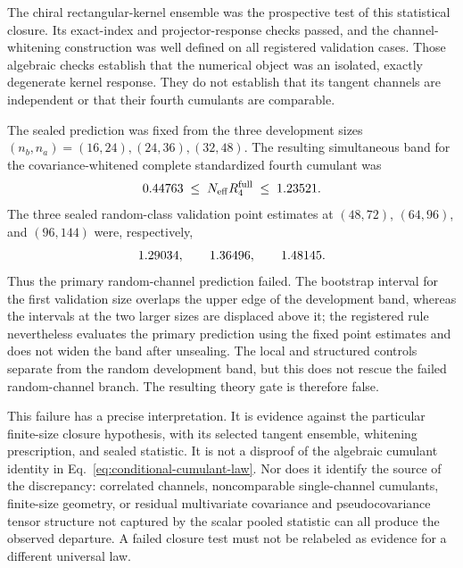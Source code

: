 The chiral rectangular-kernel ensemble was the prospective test of this
statistical closure.  Its exact-index and projector-response checks passed,
and the channel-whitening construction was well defined on all registered
validation cases.  Those algebraic checks establish that the numerical object
was an isolated, exactly degenerate kernel response.  They do not establish
that its tangent channels are independent or that their fourth cumulants are
comparable.

The sealed prediction was fixed from the three development sizes
$(n_b,n_a)=(16,24),(24,36),(32,48)$.  The resulting simultaneous band for the
covariance-whitened complete standardized fourth cumulant was
\begin{equation}
 0.44763\;\leq\;N_{\mathrm{eff}}R_4^{\mathrm{full}}
 \;\leq\;1.23521.
 \label{eq:chiral-frozen-band}
\end{equation}
The three sealed random-class validation point estimates at
$(48,72)$, $(64,96)$, and $(96,144)$ were, respectively,
\begin{equation}
 1.29034,\qquad 1.36496,\qquad
 1.48145.
 \label{eq:chiral-random-outcomes}
\end{equation}
Thus the primary random-channel prediction failed.  The bootstrap interval
for the first validation size overlaps the upper edge of the development band,
whereas the intervals at the two larger sizes are displaced above it; the
registered rule nevertheless evaluates the primary prediction using the fixed
point estimates and does not widen the band after unsealing.  The local and
structured controls separate from the random development band, but this does
not rescue the failed random-channel branch.  The resulting theory gate is
therefore false.

This failure has a precise interpretation.  It is evidence against the
particular finite-size closure hypothesis, with its selected tangent ensemble,
whitening prescription, and sealed statistic.  It is not a disproof of the
algebraic cumulant identity in Eq.~\eqref{eq:conditional-cumulant-law}.  Nor
does it identify the source of the discrepancy: correlated channels,
noncomparable single-channel cumulants, finite-size geometry, or residual
multivariate covariance and pseudocovariance tensor structure not captured by
the scalar pooled statistic can all produce the observed departure.  A failed
closure test must not be relabeled as evidence for a different universal law.

